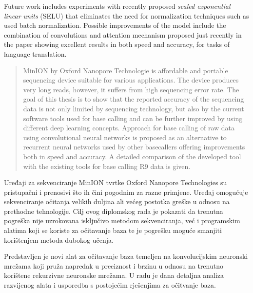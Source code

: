\documentclass[times, utf8, diplomski, numeric, english]{fer}
\begin{document}
Future work includes experiments with recently proposed \textit{scaled exponential linear units} (SELU)\cite{selu} that eliminates the need for normalization techniques such as used batch normalization. Possible improvements of the model include the combination of convolutions and attention mechanism proposed just recently in the paper\cite{facebook} showing excellent results in both speed and accuracy, for tasks of language translation. 





\begin{abstract}


MinION by Oxford Nanopore Technologie is affordable and portable sequencing device suitable for various applications. The device produces very long reads, however, it suffers from high sequencing error rate. 
The goal of this thesis is to show that the reported accuracy of the sequencing data is not only limited by sequencing technology, but also by the current software tools used for base calling and can be further improved by using different deep learning concepts.
Approach for base calling of raw data using convolutional neural networks is proposed as an alternative to recurrent neural networks used by other basecallers offering improvements both in  speed and accuracy. A detailed comparison of the developed tool with the existing tools  for base calling R9 data is given.

\end{abstract}

\begin{sazetak}


Uređaji za sekvenciranje MinION tvrtke Oxford Nanopore Technologies su pristupačni i prenosivi što ih čini pogodnim za razne primjene. 
Uređaj omogućuje sekvenciranje očitanja velikih duljina ali većeg postotka greške u odnosu na prethodne tehnologije.
Cilj ovog diplomskog rada je pokazati da trenutna pogreška nije uzrokovana isključivo metodom sekvenciranja, već i programskim alatima koji se koriste za očitavanje baza te je pogrešku moguće smanjiti korištenjem metoda dubokog učenja.

Predstavljen je novi alat za očitavanje baza temeljen na konvolucijskim neuronski mrežama koji pruža napredak u preciznost i brzinu u odnosu na trenutno korištene rekurzivne neuronske mrežama. U radu je dana detaljna analiza razvijenog alata i usporedba s postojećim rješenjima za očitvanje baza.

\end{sazetak}
\end{document}
